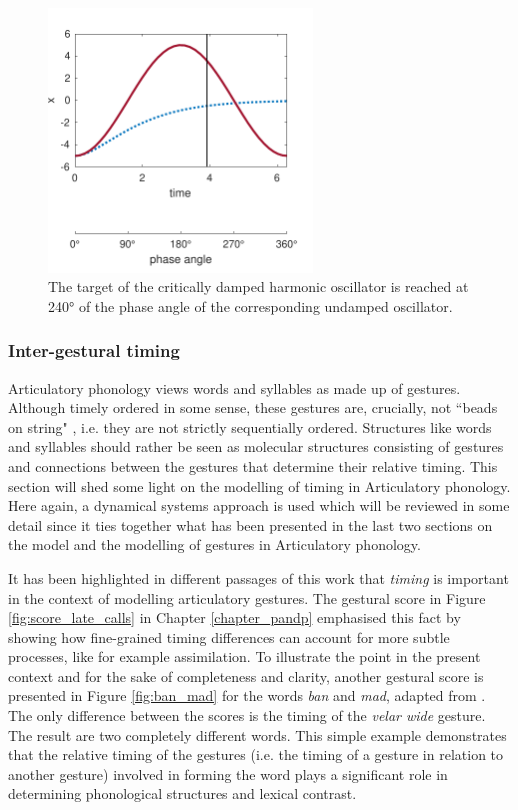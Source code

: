 \begin{figure}
\includegraphics[width=7cm]{figures/ch3/target_240_degrees.pdf}
\caption{The target of the critically damped harmonic oscillator is reached at 240° of the phase angle of the corresponding undamped oscillator.}
\label{fig:dho_240}
\end{figure}

\subsubsection{Inter-gestural timing}

Articulatory phonology views words and syllables as made up of gestures. Although timely ordered in some sense, these gestures are, crucially, not ``beads on string" \citep{Pouplier2011}, i.e. they are not strictly sequentially ordered. Structures like words and syllables should rather be seen as molecular structures \citep{NamGoldsteinSaltzman2009} consisting of gestures and connections between the gestures that determine their relative timing. This section will shed some light on the modelling of timing in Articulatory phonology. Here again, a dynamical systems approach is used which will be reviewed in some detail since it ties together what has been presented in the last two sections on the \citet{HakenKelsoBunz1985} model and the modelling of gestures in Articulatory phonology. 

It has been highlighted in different passages of this work that \emph{timing} is important in the context of  modelling articulatory gestures. The gestural score in Figure \ref{fig:score_late_calls} in Chapter \ref{chapter_pandp} emphasised this fact by showing how fine-grained timing differences can account for more subtle processes, like for example assimilation. To illustrate the point in the present context and for the sake of completeness and clarity, another gestural score is presented in Figure \ref{fig:ban_mad} for the words \emph{ban} and \emph{mad}, adapted from \citet{Goldsteinetal2009}. The only difference between the scores is the timing of the \emph{velar wide} gesture. The result are two completely different words. This simple example demonstrates that the relative timing of the gestures (i.e. the timing of a gesture in relation to another gesture) involved in forming the word plays a significant role in determining phonological structures and lexical contrast. 

